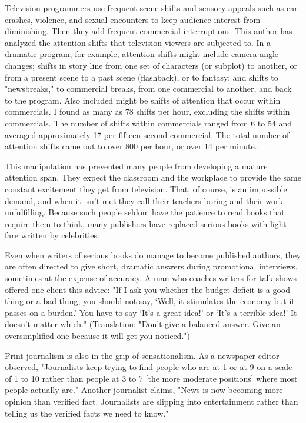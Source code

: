 \documentclass{book}
\begin{document}
Television programmers use frequent scene shifts and sensory appeals such as car crashes, violence, and sexual encounters to keep audience interest from diminishing. Then they add frequent commercial interruptions. This author has analyzed the attention shifts that television viewers are subjected to. In a dramatic program, for example, attention shifts might include camera angle changes; shifts in story line from one set of characters (or subplot) to another, or from a present scene to a past scene (flashback), or to fantasy; and shifts to "newsbreaks," to commercial breaks, from one commercial to another, and back to the program. Also included might be shifts of attention that occur within commercials. I found as many as 78 shifts per hour, excluding the shifts within commercials. The number of shifts within commercials ranged from 6 to 54 and averaged approximately 17 per fifteen-second commercial. The total number of attention shifts came out to over 800 per hour, or over 14 per minute.

This manipulation has prevented many people from developing a mature attention span. They expect the classroom and the workplace to provide the same constant excitement they get from television. That, of course, is an impossible demand, and when it isn’t met they call their teachers boring and their work unfulfilling. Because such people seldom have the patience to read books that require them to think, many publishers have replaced serious books with light fare written by celebrities.

Even when writers of serious books do manage to become published authors, they are often directed to give short, dramatic answers during promotional interviews, sometimes at the expense of accuracy. A man who coaches writers for talk shows offered one client this advice: "If I ask you whether the budget deficit is a good thing or a bad thing, you should not say, ‘Well, it stimulates the economy but it passes on a burden.’ You have to say ‘It’s a great idea!’ or ‘It’s a terrible idea!’ It doesn’t matter which." (Translation: "Don’t give a balanced answer. Give an oversimplified one because it will get you noticed.")

Print journalism is also in the grip of sensationalism. As a newspaper editor observed, "Journalists keep trying to find people who are at 1 or at 9 on a scale of 1 to 10 rather than people at 3 to 7 [the more moderate positions] where most people actually are." Another journalist claims, "News is now becoming more opinion than verified fact. Journalists are slipping into entertainment rather than telling us the verified facts we need to know."
\end{document}
